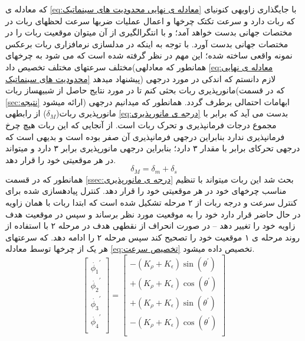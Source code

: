 \documentclass[10pt,a4paper]{article}
\newcommand{\نیمفاصله}{\halfspace}
\renewcommand{\ }{\halfspace}
\begin{document}
که معادله ی
\ref{eq:معادله ی نهایی محدودیت های سینماتیک}
با جایگذاری زاویه\ ی کنونی\ ای که ربات دارد و سرعت تک\ تک چرخ\ ها و اعمال عملیات ضرب\ ها سرعت لحظه\ ای ربات در مختصات جهانی بدست خواهد آمد؛ و با انتگرال\ گیری از آن می\ توان موقعیت ربات را در مختصات جهانی بدست آورد.
 \زیرقسمت{درجه\ ی مانورپذیری ربات مدل\ سازی شده}
\label{ssec:درجه ی مانورپذیری}
با توجه به اینکه در مدل\ سازی نرم\ افزاری ربات بر\ عکس نمونه واقعی ساخته شده؛ این مهم در نظر گرفته شده است که می شود به چرخ\ های مختلف سرعت\ های مختلف تخصیص داد(همان\ طور که معادله\ ی
\ref{eq:معادله ی نهایی محدودیت های سینماتیک}
پیشنهاد میدهد) لازم دانستم که اندکی در مورد درجه\ ی مانورپذیری ربات بحثی کنم تا در مورد نتایج حاصل از شبیه\ ساز ربات(که در قسمت
\ref{sec:نتیجه}
ارائه میشود) ابهامات احتمالی برطرف گردد.
همانطور که میدانیم درجه\ ی مانورپذیری ربات($\delta_M$) از رابطه\ ی
\ref{eq:درجه ی مانورپذیری}
بدست می آید که برابر با مجموع درجات فرمان\ پذیری و تحرک ربات است. از آنجایی که این ربات هیچ چرخ فرمان\ پذیری ندارد بنابراین درجه\ ی فرمان\ پذیری آن صفر بوده است و بدیهی است که درجه\ ی تحرک\ ای برابر با مقدار ۳ دارد؛ بنابراین درجه\ ی مانورپذیری برابر ۳ دارد و میتواند در هر موقعیتی خود را قرار دهد.
\begin{equation}
\delta_M = \delta_m + \delta_s
\label{eq:درجه ی مانورپذیری}
\end{equation}
همانطور که در قسمت
\ref{ssec:درجه ی مانورپذیری}
بحث شد این ربات میتواند با تنظیم مناسب چرخ\ های خود در هر موقعیتی خود را قرار دهد. کنترل پیاده\ سازی شده برای کنترل سرعت و درجه ربات از ۲ مرحله تشکیل شده است که ابتدا ربات با همان زاویه در حال حاضر قرار دارد خود را به موقعیت مورد نظر برساند و سپس در موقعیت هدف زاویه خود را تغییر دهد -- در صورت انحراف از نقطه\ ی هدف در مرحله ۲ با استفاده از روند مرحله ی ۱ موقعیت خود را تصحیح کند سپس مرحله ۲ را ادامه دهد. که سرعت\ های هر یک از چرخ\ ها توسط معادله
\ref{eq:تخصیص سرعت}
تخصیص داده میشود.
\begin{equation}
\begin{bmatrix}
\dot{\phi_1}^\prime\\
\dot{\phi_2}^\prime\\
\dot{\phi_3}^\prime\\
\dot{\phi_4}^\prime\\
\end{bmatrix} = \begin{bmatrix}
-(K_{\rho} + K_{\epsilon})\sin{(\theta^\prime)}\\
+(K_{\rho} + K_{\epsilon})\cos{(\theta^\prime)}\\
+(K_{\rho} + K_{\epsilon})\sin{(\theta^\prime)}\\
-(K_{\rho} + K_{\epsilon})\cos{(\theta^\prime)}\\
\end{bmatrix}
\label{eq:تخصیص سرعت}
\end{equation}
\end{document}
